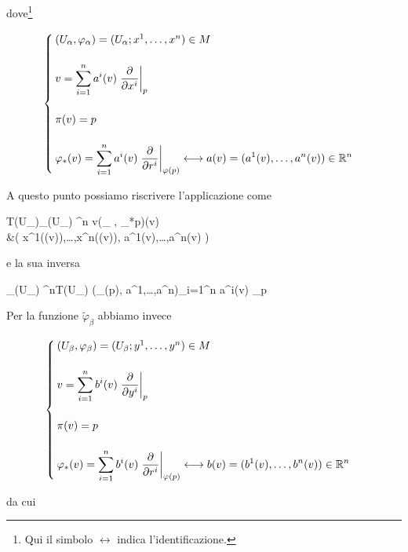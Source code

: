 dove\footnote{%
	Qui il simbolo $ \longleftrightarrow $ indica l'identificazione.%
}

\begin{equation}
	\begin{cases}
		(U_{\alpha},\varphi_{\alpha}) = (U_{\alpha}; x^{1},\dots,x^{n}) \in M \\ \\
		v = \displaystyle \sum_{i=1}^{n} a^{i}(v) \eval{ \pdv{x^{i}} }_{p} \\ \\
		\pi(v) = p \\ \\
		\varphi_{*}(v) = \displaystyle \sum_{i=1}^{n} a^{i}(v) \eval{ \pdv{r^{i}} }_{\varphi(p)} \longleftrightarrow a(v) = (a^{1}(v),\dots,a^{n}(v)) \in \R^{n}
	\end{cases}	
\end{equation}

A questo punto possiamo riscrivere l'applicazione come

\map{\tilde{\varphi}_{\alpha}}
	{T(U_{\alpha})}{\varphi_{\alpha}(U_{\alpha}) \times \R^{n}}
	{v}{(\varphi_{\alpha} \circ \pi, \varphi_{*p})(v) \\
		&\mapsto \left( x^{1}(\pi(v)),\dots,x^{n}(\pi(v)), a^{1}(v),\dots,a^{n}(v) \right)}

e la sua inversa

	{\varphi_{\alpha}(U_{\alpha}) \times \R^{n}}{T(U_{\alpha})}
	{(\varphi_{\alpha}(p), a^{1},\dots,a^{n})}{\sum_{i=1}^{n} a^{i}(v) _{p}}

Per la funzione $ \tilde{\varphi}_{\beta} $ abbiamo invece

\begin{equation}
	\begin{cases}
		(U_{\beta},\varphi_{\beta}) = (U_{\beta}; y^{1},\dots,y^{n}) \in M \\ \\
		v = \displaystyle \sum_{i=1}^{n} b^{i}(v) \eval{ \pdv{y^{i}} }_{p} \\ \\
		\pi(v) = p \\ \\
		\varphi_{*}(v) = \displaystyle \sum_{i=1}^{n} b^{i}(v) \eval{ \pdv{r^{i}} }_{\varphi(p)} \longleftrightarrow b(v) = (b^{1}(v),\dots,b^{n}(v)) \in \R^{n}
	\end{cases}	
\end{equation}

da cui

